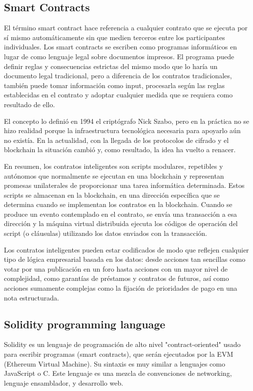 \subsection{Smart Contracts}
El término smart contract hace referencia a cualquier contrato que se ejecuta por sí mismo
automáticamente sin que medien terceros entre los participantes individuales. Los smart contracts
se escriben como programas informáticos en lugar de como lenguaje legal sobre documentos impresos.
El programa puede definir reglas y consecuencias estrictas del mismo modo que lo haría un documento
legal tradicional, pero a diferencia de los contratos tradicionales, también puede tomar
información como input, procesarla según las reglas establecidas en el contrato y adoptar cualquier
medida que se requiera como resultado de ello.

El concepto lo definió en 1994 el criptógrafo Nick Szabo, pero en la práctica no se hizo realidad
porque la infraestructura tecnológica necesaria para apoyarlo aún no existía. En la actualidad, con
la llegada de los protocolos de cifrado y el blockchain la situación cambió y, como resultado, la
idea ha vuelto a renacer.

En resumen, los contratos inteligentes son scripts modulares, repetibles y autónomos que
normalmente se ejecutan en una blockchain y representan promesas unilaterales de proporcionar una
tarea informática determinada. Estos scripts se almacenan en la blockchain, en una dirección
específica que se determina cuando se implementan los contratos en la blockchain. Cuando se produce
un evento contemplado en el contrato, se envía una transacción a esa dirección y la máquina virtual
distribuida ejecuta los códigos de operación del script (o cláusulas) utilizando los datos enviados
con la transacción.

Los contratos inteligentes pueden estar codificados de modo que reflejen cualquier tipo de lógica
empresarial basada en los datos: desde acciones tan sencillas como votar por una publicación en un
foro hasta acciones con un mayor nivel de complejidad, como garantías de préstamos y contratos de
futuros, así como acciones sumamente complejas como la fijación de prioridades de pago en una nota
estructurada.


\subsection{Solidity programming language}
Solidity es un lenguaje de programación de alto nivel "contract-oriented" usado para escribir
programas (smart contracts), que serán ejecutados por la EVM (Ethereum Virtual Machine). Su
sintaxis es muy similar a lenguajes como JavaScript o C.
Este lenguaje es una mezcla de convenciones de networking, lenguaje ensamblador, y desarrollo web.

